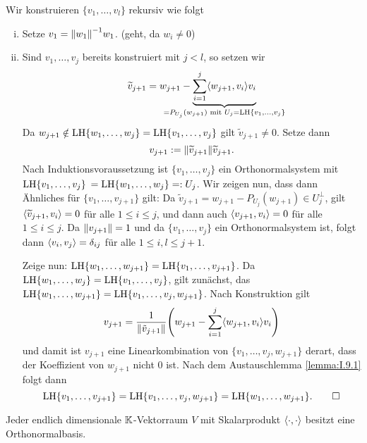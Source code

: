 \begin{beweis}
	Wir konstruieren $\{v_1,\dots,v_l\}$ rekursiv wie folgt
	\begin{enumerate}[(i)]
		\item Setze $v_1 = \no{w_1}^{-1} w_1$. (geht, da $w_i \neq 0$)
		\item Sind $v_1,\dots,v_j$ bereits konstruiert mit $j < l$, so setzen wir
		\[
			\widetilde{v}_{j+1} = w_{j+1} - \Underbrace{\sum_{i=1}^{j} \sk{w_{j+1},v_i} v_i}{\mathclap{=P_{U_j}(w_{j+1}) \text{ mit } U_j = \LH\{v_1,\dots,v_j\}}}
		\]
		Da $w_{j+1} \notin \operatorname{LH}\{w_1,\dots,w_j\} = \operatorname{LH}\{v_1,\dots,v_j\}$ gilt $\widetilde{v}_{j+1} \neq 0$.
		Setze dann
		\[
			v_{j+1} := \no{\widetilde{v}_{j+1}} \widetilde{v}_{j+1}.
		\]
		Nach Induktionsvoraussetzung ist $\{v_1,\dots,v_j\}$ ein Orthonormalsystem mit $\operatorname{LH}\{v_1,\dots,v_j\}$ \linebreak $= \operatorname{LH}\{w_1,\dots,w_j\} =: U_j$.
		Wir zeigen nun, dass dann Ähnliches für $\{v_1,\dots,v_{j+1}\}$ gilt:
		\newpage
		Da $\widetilde{v}_{j+1} = w_{j+1} - P_{U_j}(w_{j+1}) \in U_j^\perp$, gilt $\left\langle\widetilde{v}_{j+1},v_i\right\rangle = 0$ für alle $1 \leq i \leq j$, und dann auch $\left\langle v_{j+1},v_i\right\rangle = 0$ für alle $1 \leq i \leq j$.
		Da $\left\lVert v_{j+1}\right\rVert = 1$ und da $\{v_1,\dots,v_j\}$ ein Orthonormalsystem ist, folgt dann $\left\langle v_i,v_j\right\rangle = \delta_{ij}$ für alle $1 \leq i,l \leq  j+1$.
		
		Zeige nun: $\operatorname{LH}\{w_1,\dots,w_{j+1}\} = \operatorname{LH}\{v_1,\dots,v_{j+1}\}$.
		Da $\operatorname{LH}\{w_1,\dots,w_j\} = \operatorname{LH}\{v_1,\dots,v_j\}$, gilt zunächst, das $\operatorname{LH}\{w_1,\dots,w_{j+1}\} = \operatorname{LH}\{v_1,\dots,v_j,w_{j+1}\}$.
		Nach Konstruktion gilt
		\[
			v_{j+1} = \frac{1}{\no{\tilde{v}_{j+1}}} \enb{w_{j+1} - \sum_{i=1}^{j} \sk{w_{j+1},v_i} v_i}
		\]
		und damit ist $v_{j+1}$ eine Linearkombination von $\{v_1,\dots,v_j,w_{j+1}\}$ derart, dass der Koeffizient von $w_{j+1}$ nicht $0$ ist.
		Nach dem Austauschlemma \ref{lemma:I.9.1} folgt dann
		\[
			\operatorname{LH}\{v_1,\dots,v_{j+1}\} = \operatorname{LH}\{v_1,\dots,v_j,w_{j+1}\} = \operatorname{LH}\{w_1,\dots,w_{j+1}\}. \qedhere
		\]
	\end{enumerate}
\end{beweis}

\begin{korollar}
	\label{kor:4.14}
	Jeder endlich dimensionale $\mathbb{K}$-Vektorraum $V$ mit Skalarprodukt $\left\langle\cdot,\cdot\right\rangle$ besitzt eine Orthonormalbasis.
\end{korollar}

